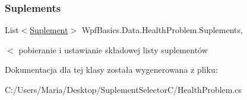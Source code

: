 \subsubsection{\texorpdfstring{Suplements}{Suplements}}
{\footnotesize\ttfamily List$<$\hyperlink{class_wpf_basics_1_1_data_1_1_suplement}{Suplement}$>$ Wpf\+Basics.\+Data.\+Health\+Problem.\+Suplements\hspace{0.3cm}{\ttfamily [get]}, {\ttfamily [set]}}

$<$ pobieranie i ustawianie składowej listy suplementów 

Dokumentacja dla tej klasy została wygenerowana z pliku\+:\begin{DoxyCompactItemize}
\item 
C\+:/\+Users/\+Maria/\+Desktop/\+Suplement\+Selector\+C/Health\+Problem.\+cs\end{DoxyCompactItemize}
